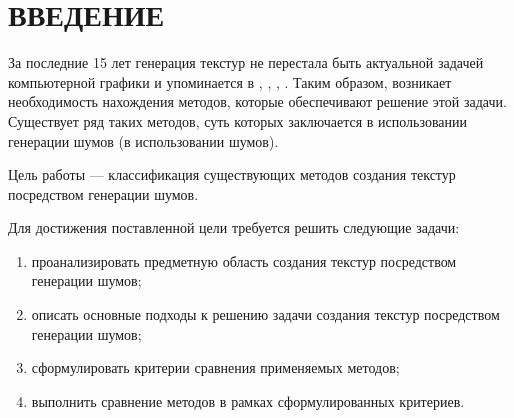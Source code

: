 \chapter*{ВВЕДЕНИЕ}

За последние 15 лет генерация текстур не перестала быть актуальной задачей компьютерной графики и упоминается в \cite{8942651}, \cite{10042545}, \cite{TRINCHAOANDRADE201228}, \cite{Groueix_2018_CVPR}.
Таким образом, возникает необходимость нахождения методов, которые обеспечивают решение этой задачи.
Существует ряд таких методов, суть которых заключается в использовании генерации шумов (в использовании шумов).

Цель работы --- классификация существующих методов создания текстур посредством генерации шумов.

Для достижения поставленной цели требуется решить следующие задачи:
\begin{enumerate}
	\item проанализировать предметную область создания текстур посредством генерации шумов;
	\item описать основные подходы к решению задачи создания текстур посредством генерации шумов;
	\item сформулировать критерии сравнения применяемых методов;
	\item выполнить сравнение методов в рамках сформулированных критериев.
\end{enumerate}